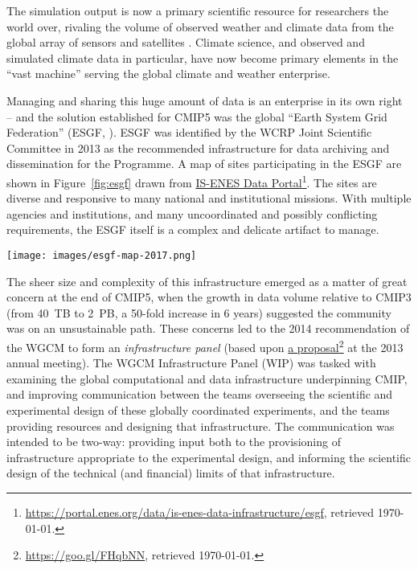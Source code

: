 \documentclass[gmd,manuscript]{copernicus}
\newcommand{\pllabel}[1]{\label{p-#1}\linelabel{l-#1}}
\newcommand{\urlref}[2] {\href{#1}{#2}\footnote{\url{#1}, retrieved \today.}}
\begin{document}
The simulation output is now a primary scientific resource for
researchers the world over, rivaling the volume of observed weather
and climate data from the global array of sensors and satellites
\citep{ref:overpecketal2011}. Climate science, and observed and simulated
climate data in particular, have now become primary elements in the
``vast machine'' \citep{ref:edwards2010} serving the global climate and
weather enterprise.

Managing and sharing this huge amount of data is an enterprise in its
own right -- and the solution established for CMIP5 was the global
``Earth System Grid Federation'' (ESGF, \citep{ref:williamsetal2015}).
ESGF was identified by the WCRP Joint Scientific Committee in 2013 as
the recommended infrastructure for data archiving and dissemination
for the Programme.
\pllabel{RC2-12}
A map of sites participating in the ESGF are shown in
\pllabel{RC2-8}
Figure~\ref{fig:esgf} drawn from
\urlref{https://portal.enes.org/data/is-enes-data-infrastructure/esgf}{IS-ENES
  Data Portal}. The sites are diverse and responsive to many national
and institutional missions. With multiple agencies and institutions,
and many uncoordinated and possibly conflicting requirements, the ESGF
itself is a complex and delicate
\pllabel{RC2-10}
artifact to manage.

\begin{figure*}
  \begin{center}
    \texttt{[image: images/esgf-map-2017.png]}
  \end{center}
  \caption{Sites participating in the Earth System Grid Federation in
    May 2017. Figure courtesy IS-ENES Data Portal. }
  \label{fig:esgf}
\end{figure*}

The sheer size and complexity of this infrastructure emerged as a
matter of great concern at the end of CMIP5, when the growth in data
volume relative to CMIP3 (from 40~TB to 2~PB, a 50-fold increase in 6
years) suggested the community was on an unsustainable path. These
concerns led to the 2014 recommendation of the WGCM to form an
\emph{infrastructure panel} (based upon
\pllabel{RC2-11}
\urlref{https://goo.gl/FHqbNN}{a proposal} at the 2013 annual
meeting). The WGCM Infrastructure Panel (WIP) was tasked with
examining the global computational and data infrastructure
underpinning CMIP, and improving communication between the teams
overseeing the scientific and experimental design of these globally
coordinated experiments, and the teams providing resources and
designing that infrastructure. The communication was intended to be
two-way: providing input both to the provisioning of infrastructure
appropriate to the experimental design, and informing the scientific
design of the technical (and financial) limits of that infrastructure.
\end{document}
